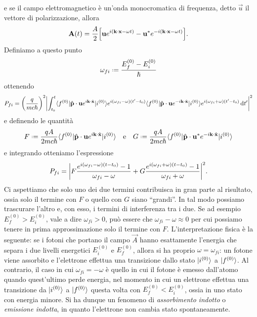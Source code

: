 e se il campo elettromagnetico è un'onda monocromatica di frequenza, detto $\vec u$ il vettore di polarizzazione, allora
\begin{equation}
	\vec A(t)=\frac{A}2\Big[\vec u e^{i(\scalar{\vec k}{\vec x}-\omega t)}-\vec u^*e^{-i(\scalar{\vec k}{\vec x}-\omega t)}\Big].
	\label{eq:campo-elettromagnetico-monocromatico}
\end{equation}
Definiamo a questo punto
\begin{equation}
	\omega_{fi}\defeq\frac{E_f^{(0)}-E_i^{(0)}}{\hbar}
	\label{eq:frequenza-transizione}
\end{equation}
ottenendo
\begin{equation}
    P_{fi}=\bigg(\frac{q}{mc\hbar}\bigg)^2\abs[\bigg]{\int_{t_0}^t
		\bra{f^{(0)}}\scalar{\op{\vec p}}{\vec u}e^{i\scalar{\vec k}{\op{\vec x}}}\ket{i^{(0)}}e^{i(\omega_{fi}-\omega)(t'-t_0)}
		\bra{f^{(0)}}\scalar{\op{\vec p}}{\vec u}e^{-i\scalar{\vec k}{\op{\vec x}}}\ket{i^{(0)}}e^{i(\omega_{fi}+\omega)(t'-t_0)}
	\,\dd t'}^2
\end{equation}
e definendo le quantità
\begin{equation}
	F\defeq\frac{qA}{2mc\hbar}\bra{f^{(0)}}\scalar{\op{\vec p}}{\vec u}e^{i\scalar{\vec k}{\op{\vec x}}}\ket{i^{(0)}}
	\qeq
	G\defeq\frac{qA}{2mc\hbar}\bra{f^{(0)}}\scalar{\op{\vec p}}{\vec u^*}e^{-i\scalar{\vec k}{\op{\vec x}}}\ket{i^{(0)}}
\end{equation}
e integrando otteniamo l'espressione
\begin{equation}
    P_{fi}=\abs[\bigg]{F\frac{e^{i(\omega_{fi}-\omega)(t-t_0)}-1}{\omega_{fi}-\omega}+G\frac{e^{i(\omega_{fi}+\omega)(t-t_0)}-1}{\omega_{fi}+\omega}}^2.
\end{equation}
Ci aspettiamo che solo uno dei due termini contribuisca in gran parte al risultato, ossia solo il termine con $F$ o quello con $G$ siano ``grandi''.
In tal modo possiamo trascurare l'altro e, con esso, i termini di interferenza tra i due.
Se ad esempio $E_f^{(0)}>E_i^{(0)}$, vale a dire $\omega_{fi}>0$, può essere che $\omega_{fi}-\omega\approx 0$ per cui possiamo tenere in prima approssimazione solo il termine con $F$.
L'interpretazione fisica è la seguente: se i fotoni che portano il campo $\vec A$ hanno esattamente l'energia che separa i due livelli energetici $E_i^{(0)}$ e $E_f^{(0)}$, allora si ha proprio $\omega=\omega_{fi}$: un fotone viene assorbito e l'elettrone effettua una transizione dallo stato $\ket{i^{(0)}}$ a $\ket{f^{(0)}}$.
Al contrario, il caso in cui $\omega_{fi}=-\omega$ è quello in cui il fotone è emesso dall'atomo quando quest'ultimo perde energia, nel momento in cui un elettrone effettua una transizione da $\ket{i^{(0)}}$ a $\ket{f^{(0)}}$ questa volta con $E_f^{(0)}<E_i^{(0)}$, ossia in uno stato con energia minore.
Si ha dunque un fenomeno di \emph{assorbimento indotto} o \emph{emissione indotta}, in quanto l'elettrone non cambia stato spontaneamente.


